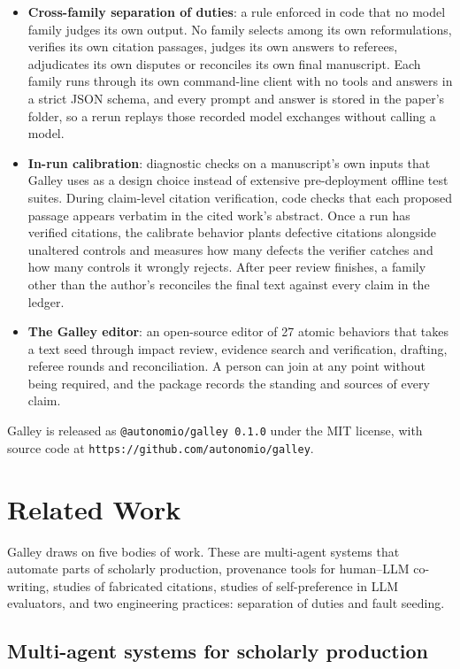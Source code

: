 \documentclass[
]{article}
\begin{document}
\begin{itemize}
\item
  \textbf{Cross-family separation of duties}: a rule enforced in code
  that no model family judges its own output. No family selects among
  its own reformulations, verifies its own citation passages, judges its
  own answers to referees, adjudicates its own disputes or reconciles
  its own final manuscript. Each family runs through its own
  command-line client with no tools and answers in a strict JSON schema,
  and every prompt and answer is stored in the paper's folder, so a
  rerun replays those recorded model exchanges without calling a model.
\item
  \textbf{In-run calibration}: diagnostic checks on a manuscript's own
  inputs that Galley uses as a design choice instead of extensive
  pre-deployment offline test suites. During claim-level citation
  verification, code checks that each proposed passage appears verbatim
  in the cited work's abstract. Once a run has verified citations, the
  calibrate behavior plants defective citations alongside unaltered
  controls and measures how many defects the verifier catches and how
  many controls it wrongly rejects. After peer review finishes, a family
  other than the author's reconciles the final text against every claim
  in the ledger.
\item
  \textbf{The Galley editor}: an open-source editor of 27 atomic
  behaviors that takes a text seed through impact review, evidence
  search and verification, drafting, referee rounds and reconciliation.
  A person can join at any point without being required, and the package
  records the standing and sources of every claim.
\end{itemize}

Galley is released as \texttt{@autonomio/galley\ 0.1.0} under the MIT
license, with source code at
\texttt{https://github.com/autonomio/galley}.

\section{Related Work}\label{related-work}

Galley draws on five bodies of work. These are multi-agent systems that
automate parts of scholarly production, provenance tools for human--LLM
co-writing, studies of fabricated citations, studies of self-preference
in LLM evaluators, and two engineering practices: separation of duties
and fault seeding.

\subsection{Multi-agent systems for scholarly
production}\label{multi-agent-systems-for-scholarly-production}
\end{document}
